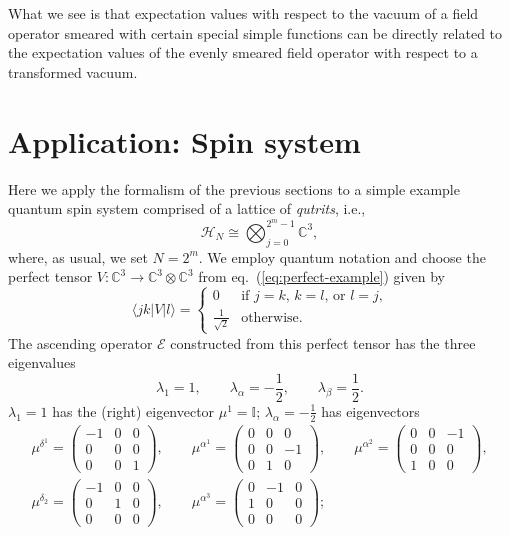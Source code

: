 \documentclass[11pt,oneside]{amsart}
\theoremstyle{plain}%
\theoremstyle{definition}
\theoremstyle{remark}
\begin{document}
What we see is that expectation values with respect to the vacuum of a field operator smeared with certain special simple functions can be directly related to the expectation values of the evenly smeared field operator with respect to a transformed vacuum.


\section{Application: Spin system}\label{sec:example1}

Here we apply the formalism of the previous sections to a simple example quantum spin system comprised of a lattice of \emph{qutrits}, i.e.,
\begin{equation}
	\mathcal{H}_N \cong \bigotimes_{j=0}^{2^m-1} \mathbb{C}^3,
\end{equation}
where, as usual, we set $N=2^m$. We employ quantum notation and choose the perfect tensor $V\colon\mathbb{C}^3\to\mathbb{C}^3\otimes\mathbb{C}^3$ from eq.~(\ref{eq:perfect-example}) given by
\begin{equation}
	\langle jk|V|l\rangle = \begin{cases}
		0 & \text{if $j=k$, $k=l$, or $l=j$,}\\
		\frac{1}{\sqrt{2}} & \text{otherwise.}
	\end{cases}
\end{equation}
The ascending operator $\mathcal{E}$ constructed from this perfect tensor has the three eigenvalues
\begin{equation}
	\lambda_1=1, \qquad \lambda_\alpha=-\frac{1}{2}, \qquad \lambda_\beta=\frac{1}{2}.
\end{equation}
$\lambda_1=1$ has the (right) eigenvector $\mu^1=\mathbb{I}$; $\lambda_\alpha=-\frac{1}{2}$ has eigenvectors
\begin{gather}
	\mu^{\delta^1}=\begin{pmatrix}
		-1&0&0\\
		0&0&0\\
		0&0&1
	\end{pmatrix}, \qquad
	\mu^{\alpha^1}=\begin{pmatrix}
		0&0&0\\
		0&0&-1\\
		0&1&0
	\end{pmatrix}, \qquad
	\mu^{\alpha^2}=\begin{pmatrix}
		0&0&-1\\
		0&0&0\\
		1&0&0
	\end{pmatrix},\\
	\mu^{\delta_2}=\begin{pmatrix}
		-1&0&0\\
		0&1&0\\
		0&0&0
	\end{pmatrix}, \qquad
	\mu^{\alpha^3}=\begin{pmatrix}
		0&-1&0\\
		1&0&0\\
		0&0&0
	\end{pmatrix};
\end{gather}
\end{document}
